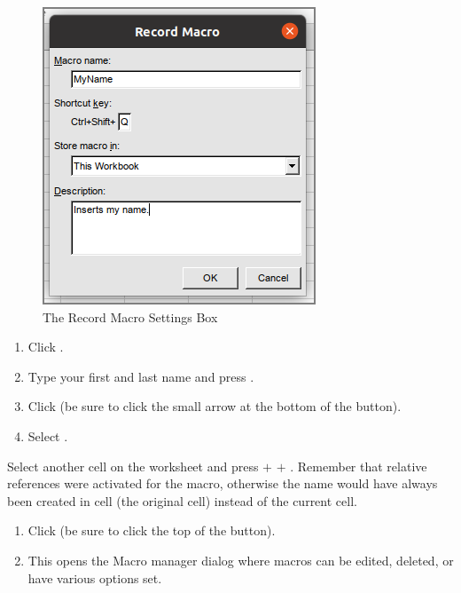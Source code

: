 \begin{figure}[H]
	\centering
	\includegraphics[width=\maxwidth{.95\linewidth}]{gfx/ch09_fig50}
	\caption{The Record Macro Settings Box}
	\label{09:fig50}
\end{figure}

\begin{enumerate}[resume]	
	\item Click .
	\item Type your first and last name and press .
	\item Click  (be sure to click the small arrow at the bottom of the  button).
	\item Select .
\end{enumerate}

Select another cell on the worksheet and press  $ + $  $ + $ . Remember that relative references were activated for the macro, otherwise the name would have always been created in cell  (the original cell) instead of the current cell.

\begin{enumerate}
	\item Click  (be sure to click the top of the  button).
	\item This opens the Macro manager dialog where macros can be edited, deleted, or have various options set.
\end{enumerate}

